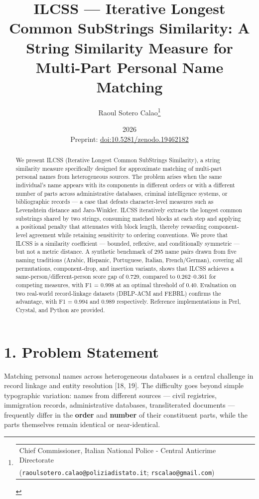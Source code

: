 \documentclass[
  11pt,
]{article}
\title{ILCSS --- Iterative Longest Common SubStrings Similarity: A
String Similarity Measure for Multi-Part Personal Name Matching}
\author{Raoul Sotero Calao\thanks{\footnotesize\begin{tabular}[t]{@{}l@{}}
  Chief Commissioner, Italian National Police - Central Anticrime Directorate\\
  (\texttt{raoulsotero.calao@poliziadistato.it}; \texttt{rscalao@gmail.com})
\end{tabular}}}
\date{2026\\[0.5em]\small Preprint: \href{https://doi.org/10.5281/zenodo.19462182}{doi:10.5281/zenodo.19462182}}
\begin{document}
\maketitle
\begin{abstract}
We present ILCSS (Iterative Longest Common SubStrings Similarity), a
string similarity measure specifically designed for approximate matching
of multi-part personal names from heterogeneous sources. The problem
arises when the same individual's name appears with its components in
different orders or with a different number of parts across
administrative databases, criminal intelligence systems, or
bibliographic records --- a case that defeats character-level measures
such as Levenshtein distance and Jaro-Winkler. ILCSS iteratively
extracts the longest common substrings shared by two strings, consuming
matched blocks at each step and applying a positional penalty that
attenuates with block length, thereby rewarding component-level
agreement while retaining sensitivity to ordering conventions. We prove
that ILCSS is a similarity coefficient --- bounded, reflexive, and
conditionally symmetric --- but not a metric distance. A synthetic
benchmark of 295 name pairs drawn from five naming traditions (Arabic,
Hispanic, Portuguese, Italian, French/German), covering all
permutations, component-drop, and insertion variants, shows that ILCSS
achieves a same-person/different-person score gap of 0.729, compared to
0.262--0.361 for competing measures, with F1 = 0.998 at an optimal
threshold of 0.40. Evaluation on two real-world record-linkage datasets
(DBLP-ACM and FEBRL) confirms the advantage, with F1 = 0.994 and 0.989
respectively. Reference implementations in Perl, Crystal, and Python are
provided.
\end{abstract}

\section{1. Problem Statement}\label{problem-statement}

Matching personal names across heterogeneous databases is a central
challenge in record linkage and entity resolution {[}18, 19{]}. The
difficulty goes beyond simple typographic variation: names from
different sources --- civil registries, immigration records,
administrative databases, transliterated documents --- frequently differ
in the \textbf{order} and \textbf{number} of their constituent parts,
while the parts themselves remain identical or near-identical.
\end{document}
